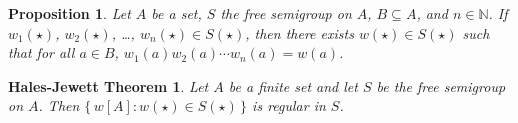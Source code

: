 \documentclass[12pt]{article}
\theoremstyle{plain}
\newtheorem*{hj}{Hales-Jewett Theorem}
\newtheorem{prop}[thm]{Proposition}
\theoremstyle{definition}
\newcommand{\bbN}{\mathbb{N}}
\begin{document}
\begin{prop}
  Let $A$ be a set, $S$ the free semigroup on $A$, $B \subseteq A$,
  and $n \in \bbN$.
  If $w_1(\star)$, $w_2(\star)$, \dots, $w_n(\star) \in S(\star)$,
  then there exists $w(\star) \in S(\star)$ such that for all $a \in
  B$, $w_1(a)w_2(a)\cdots w_n(a) = w(a)$.
\end{prop}

\begin{hj}
  Let $A$ be a finite set and let $S$ be the free semigroup on $A$. 
  Then $\{\, w[A] : w(\star) \in S(\star) \,\}$ is regular in $S$. 
\end{hj}


\end{document}
